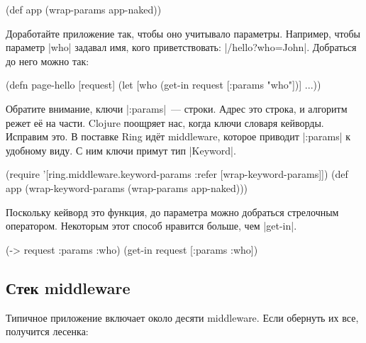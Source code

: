 \begin{english}
  \begin{clojure}
(def app (wrap-params app-naked))
  \end{clojure}
\end{english}

Доработайте приложение так, чтобы оно учитывало параметры. Например, чтобы
параметр \spverb|who| задавал имя, кого приветствовать:
\spverb|/hello?who=John|. Добраться до него можно так:

\begin{english}
  \begin{clojure}
(defn page-hello [request]
  (let [who (get-in request [:params "who"])]
    ...))
  \end{clojure}
\end{english}


Обратите внимание, ключи \spverb|:params|~--- строки. Адрес это строка, и
алгоритм режет е\"{е} на части. Clojure поощряет нас, когда ключи словаря
кейворды. Исправим это. В поставке Ring ид\"{е}т middleware, которое приводит
\spverb|:params| к удобному виду. С ним ключи примут тип \spverb|Keyword|.


\begin{english}
  \begin{clojure}
(require '[ring.middleware.keyword-params
           :refer [wrap-keyword-params]])
(def app (wrap-keyword-params (wrap-params app-naked)))
  \end{clojure}
\end{english}


Поскольку кейворд это функция, до параметра можно добраться стрелочным
оператором. Некоторым этот способ нравится больше, чем \spverb|get-in|.

\begin{english}
  \begin{clojure}
(-> request :params :who)
(get-in request [:params :who])
  \end{clojure}
\end{english}

\subsection{Стек middleware}

Типичное приложение включает около десяти middleware. Если обернуть их все,
получится лесенка:

